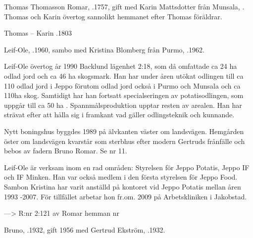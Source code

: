 
Thomas Thomasson Romar, .1757,  gift med Karin Mattsdotter från Munsala, . Thomas och Karin övertog sannolikt hemmanet efter Thomas föräldrar.
\begin{jhchildren}
  \item {}
\end{jhchildren}

Thomas   --  Karin .1803




Leif-Ole, .1960, sambo med Kristina Blomberg från Purmo, .1962.



\begin{jhchildren}
  \item {}
  \item {}
\end{jhchildren}

Leif-Ole övertog år 1990 Backlund lägenhet 2:18, som då omfattade ca 24 ha odlad jord och ca 46 ha skogsmark. Han har under åren utökat odlingen till ca 110 odlad jord i Jeppo förutom odlad jord också i Purmo och Munsala och ca 110ha skog. Samtidigt har han fortsatt specialseringen av potatisodlingen, som uppgår till ca 50 ha . Spannmålsproduktion upptar resten av arealen. Han har strävat efter att hålla sig i framkant vad gäller odlingsteknik och kunnande.

Nytt boningshus byggdes 1989 på älvkanten väster om landsvägen. Hemgården öster om landsvägen kvarstår som sterbhus efter modern Gertruds frånfälle och bebos av fadern Bruno Romar. Se nr 11.

Leif-Ole är verksam inom en rad områden: Styrelsen för Jeppo Potatis, Jeppo IF och IF Minken. Han var också medlem i den första styrelsen för Jeppo Food. Sambon Kristina har varit anställd på kontoret vid Jeppo Potatis mellan åren 1993 -2007. För tillfället arbetar hon fr.om. 2009 på Arbetskliniken i Jakobstad.


--->  R:nr 2:121 av Romar hemman nr 


 Bruno, .1932, gift 1956 med Gertrud Ekström, .1932.


